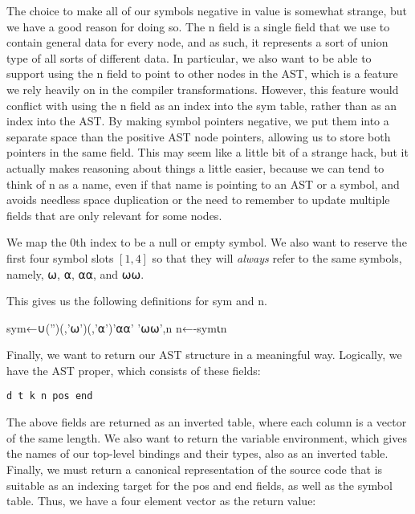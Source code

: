 \documentclass{article}%
\begin{document}
The choice to make all of our symbols negative in value is somewhat 
strange, but we have a good reason for doing so.
The {\Tt{}n\nwendquote} field is a single field that we use to contain general 
data for every node, and as such, it represents a sort of union 
type of all sorts of different data.
In particular, we also want to be able to support using the {\Tt{}n\nwendquote} 
field to point to other nodes in the AST, which is a feature we 
rely heavily on in the compiler transformations.
However, this feature would conflict with using the {\Tt{}n\nwendquote} field as an 
index into the {\Tt{}sym\nwendquote} table, rather than as an index into the AST.
By making symbol pointers negative, we put them into a separate 
space than the positive AST node pointers, allowing us to store 
both pointers in the same field. This may seem like a little bit of 
a strange hack, but it actually makes reasoning about things a little 
easier, because we can tend to think of {\Tt{}n\nwendquote} as a name, even if that 
name is pointing to an AST or a symbol, and avoids needless space 
duplication or the need to remember to update multiple fields that are 
only relevant for some nodes.

We map the $0$th index to be a null or empty symbol. 
We also want to reserve the first four symbol slots $[1,4]$
so that they will \emph{always} refer to the same symbols, 
namely, {\Tt{}⍵\nwendquote}, {\Tt{}⍺\nwendquote}, {\Tt{}⍺⍺\nwendquote}, and {\Tt{}⍵⍵\nwendquote}. 

This gives us the following definitions for {\Tt{}sym\nwendquote} and {\Tt{}n\nwendquote}.

\nwenddocs{}\plusendmoddef\nwstartdeflinemarkup{}\nwenddeflinemarkup
sym←∪('')(,'⍵')(,'⍺')'⍺⍺' '⍵⍵',n
n←-sym⍳n
\nwendcode{}\nwdocspar

Finally, we want to return our AST structure in a meaningful way.
Logically, we have the AST proper, which consists of these fields:

\begin{verbatim}
d t k n pos end
\end{verbatim}

\noindent
The above fields are returned as an inverted table,
where each column is a vector of the same length.
We also want to return the variable environment,
which gives the names of our top-level bindings and their types,
also as an inverted table.
Finally, we must return a canonical representation of the source 
code that is suitable as an indexing target for the {\Tt{}pos\nwendquote} and {\Tt{}end\nwendquote}
fields, as well as the symbol table.
Thus, we have a four element vector as the return value:
\end{document}
